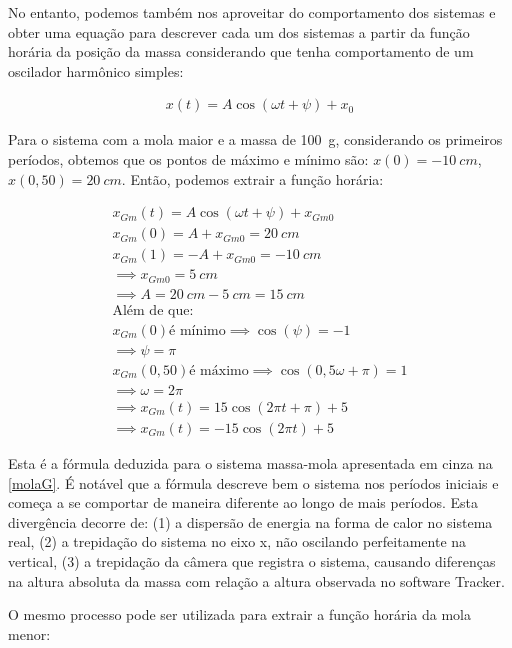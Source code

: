 No entanto, podemos também nos aproveitar do comportamento dos sistemas e obter uma equação para descrever cada um dos sistemas a partir da função horária da posição da massa considerando que tenha comportamento de um oscilador harmônico simples: 

\begin{align*}
    x(t) = A\cos(\omega t + \psi) + x_0
\end{align*}

Para o sistema com a mola maior e a massa de \qty{100}{\gram}, considerando os primeiros períodos, obtemos que os pontos de máximo e mínimo são: \(x(0) = \qty{-10}{cm}\), \(x(0,50) = \qty{20}{cm}\). Então, podemos extrair a função horária:

\begin{align*}
    x_{Gm}(t) = A\cos(\omega t + \psi) + x_{Gm0}\\
    x_{Gm}(0) = A + x_{Gm0} = \qty{20}{cm} \\
    x_{Gm}(1) = -A + x_{Gm0} = \qty{-10}{cm} \\
    \implies x_{Gm0} = \qty{5}{cm}\\
    \implies A = \qty{20}{cm} - \qty{5}{cm} = \qty{15}{cm}\\
    \text{Além de que:}\\
    x_{Gm}(0) \text{é mínimo} \implies \cos(\psi) = -1\\
    \implies \psi = \pi\\
    x_{Gm}(0,50) \text{é máximo} \implies \cos(0,5\omega + \pi) = 1\\
    \implies \omega = 2 \pi\\
    \implies x_{Gm}(t) = 15\cos(2\pi t + \pi) + 5\\
    \implies x_{Gm}(t) = -15\cos(2\pi t) + 5
\end{align*}

Esta é a fórmula deduzida para o sistema massa-mola apresentada em cinza na \cref{molaG}. É notável que a fórmula descreve bem o sistema nos períodos iniciais e começa a se comportar de maneira diferente ao longo de mais períodos. Esta divergência decorre de: (1) a dispersão de energia na forma de calor no sistema real, (2) a trepidação do sistema no eixo x, não oscilando perfeitamente na vertical, (3) a trepidação da câmera que registra o sistema, causando diferenças na altura absoluta da massa com relação a altura observada no software Tracker.

O mesmo processo pode ser utilizada para extrair a função horária da mola menor:

